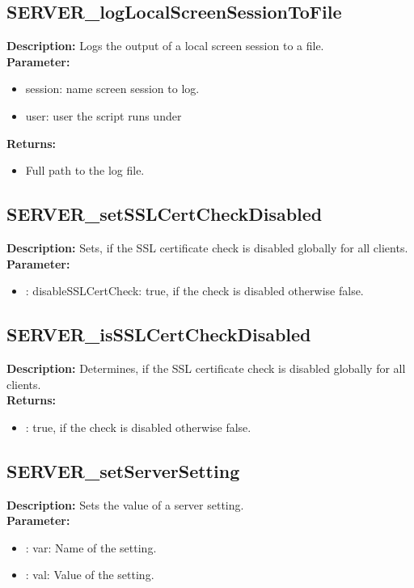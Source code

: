 \subsection{SERVER\_logLocalScreenSessionToFile}
\textbf{Description:} Logs the output of a local screen session to a file.\\
\textbf{Parameter:}
\begin{itemize}
\item session: name screen session to log.
\item user: user the script runs under
\end{itemize}
\textbf{Returns:}
\begin{itemize}
\item Full path to the log file.
\end{itemize}

\subsection{SERVER\_setSSLCertCheckDisabled}
\textbf{Description:} Sets, if the SSL certificate check is disabled globally for all clients.\\
\textbf{Parameter:}
\begin{itemize}
\item : disableSSLCertCheck: true, if the check is disabled otherwise false.
\end{itemize}

\subsection{SERVER\_isSSLCertCheckDisabled}
\textbf{Description:} Determines, if the SSL certificate check is disabled globally for all clients.\\
\textbf{Returns:}
\begin{itemize}
\item : true, if the check is disabled otherwise false.
\end{itemize}

\subsection{SERVER\_setServerSetting}
\textbf{Description:} Sets the value of a server setting.\\
\textbf{Parameter:}
\begin{itemize}
\item : var: Name of the setting.
\item : val: Value of the setting.
\end{itemize}

